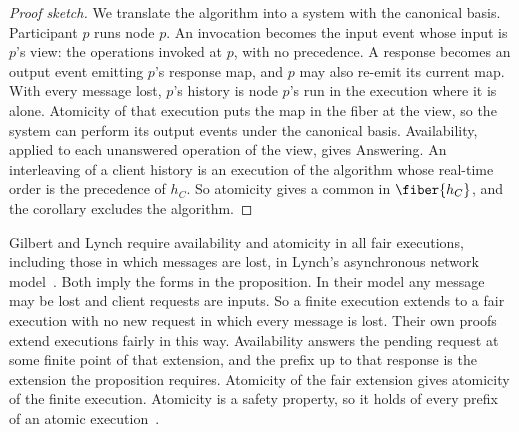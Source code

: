 \begin{proof}[Proof sketch]
We translate the algorithm into a system with the canonical basis.  Participant
$p$ runs node $p$.  An invocation becomes the input event whose input is $p$'s
view: the operations invoked at $p$, with no precedence.  A response becomes an
output event emitting $p$'s response map, and $p$ may also re-emit its current
map.  With every message lost, $p$'s history is node $p$'s run in the
execution where it is alone.  Atomicity of that execution puts the map in the
fiber at the view, so the system can perform its output events under the
canonical basis.  Availability, applied to each unanswered operation of the
view, gives Answering.  An interleaving of a client history is an execution of
the algorithm whose real-time order is the precedence of $h_C$.  So atomicity
gives a common \outnoun in $\fiber{h_C}$, and the corollary excludes the
algorithm.
\end{proof}

Gilbert and Lynch require availability and atomicity in all fair executions,
including those in which messages are lost, in Lynch's asynchronous network
model~\cite[Theorem~1]{gilbert2002cap}\cite[Chapter~8]{lynch1996distributed}.
Both imply the forms in the proposition.  In their model any message may be
lost and client requests are inputs.  So a finite execution extends to a fair
execution with no new request in which every message is lost.  Their own
proofs extend executions fairly in this way.  Availability answers the pending
request at some finite point of that extension, and the prefix up to that
response is the extension the proposition requires.  Atomicity of the fair
extension gives atomicity of the finite execution.  Atomicity is a safety
property, so it holds of every prefix of an atomic
execution~\cite[Chapter~13]{lynch1996distributed}.
